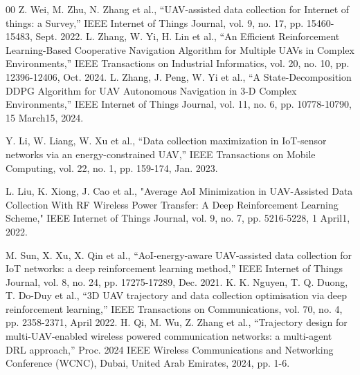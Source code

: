 \documentclass[conference]{IEEEtran}
\begin{document}
\begin{thebibliography}{00}
 Z. Wei, M. Zhu, N. Zhang et al., ``UAV-assisted data collection for Internet of things: a Survey,'' IEEE Internet of Things Journal, vol. 9, no. 17, pp. 15460-15483, Sept. 2022. 
 L. Zhang, W. Yi, H. Lin et al., ``An Efficient Reinforcement Learning-Based Cooperative Navigation Algorithm for Multiple UAVs in Complex Environments,'' IEEE Transactions on Industrial Informatics, vol. 20, no. 10, pp. 12396-12406, Oct. 2024. 
 L. Zhang, J. Peng, W. Yi et al., ``A State-Decomposition DDPG Algorithm for UAV Autonomous Navigation in 3-D Complex Environments,'' IEEE Internet of Things Journal, vol. 11, no. 6, pp. 10778-10790, 15 March15, 2024. 

 Y. Li, W. Liang, W. Xu et al., ``Data collection maximization in IoT-sensor networks via an energy-constrained UAV,'' IEEE Transactions on Mobile Computing, vol. 22, no. 1, pp. 159-174, Jan. 2023.

L. Liu, K. Xiong, J. Cao et al., "Average AoI Minimization in UAV-Assisted Data Collection With RF Wireless Power Transfer: A Deep Reinforcement Learning Scheme," IEEE Internet of Things Journal, vol. 9, no. 7, pp. 5216-5228, 1 April1, 2022. 


 M. Sun, X. Xu, X. Qin et al., ``AoI-energy-aware UAV-assisted data collection for IoT networks: a deep reinforcement learning method,'' IEEE Internet of Things Journal, vol. 8, no. 24, pp. 17275-17289, Dec. 2021. 
 K. K. Nguyen, T. Q. Duong, T. Do-Duy et al., ``3D UAV trajectory and data collection optimisation via deep reinforcement learning,'' IEEE Transactions on Communications, vol. 70, no. 4, pp. 2358-2371, April 2022. 
 H. Qi, M. Wu, Z. Zhang et al., ``Trajectory design for multi-UAV-enabled wireless powered communication networks: a multi-agent DRL approach,'' Proc. 2024 IEEE Wireless Communications and Networking Conference (WCNC), Dubai, United Arab Emirates, 2024, pp. 1-6. 


\end{thebibliography}
\end{document}
